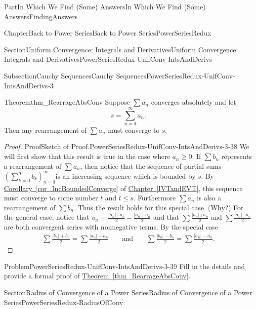 \documentclass[oneside,10pt,]{book}
\newcommand{\xreffont}{\relax}
\numberwithin{equation}{part}
\newcommand{\abs}[1]{\left|#1\right|}
\newcommand{\amp}{&}
\begin{document}
\begin{partptx}{Part}{In Which We Find (Some) Answers}{}{In Which We Find (Some) Answers}{}{}{FindingAnswers}
\begin{chapterptx}{Chapter}{Back to Power Series}{}{Back to Power Series}{}{}{PowerSeriesRedux}
\begin{sectionptx}{Section}{Uniform Convergence: Integrals and Derivatives}{}{Uniform Convergence: Integrals and Derivatives}{}{}{PowerSeriesRedux-UnifConv-IntsAndDerivs}
\begin{subsectionptx}{Subsection}{Cauchy Sequences}{}{Cauchy Sequences}{}{}{PowerSeriesRedux-UnifConv-IntsAndDerivs-3}
\begin{theorem}{Theorem}{}{}{thm_RearrageAbsConv}%
%
%
Suppose \(\sum a_n\) converges absolutely and let%
\begin{equation*}
s=\sum_{n=0}^\infty a_n\text{.}
\end{equation*}
Then any rearrangement of \(\sum a_n\) must converge to \(s\).%
\end{theorem}
\begin{proof}{Proof}{Sketch of Proof.}{PowerSeriesRedux-UnifConv-IntsAndDerivs-3-38}
We will first show that this result is true in the case where \(a_n\geq 0\).  If \(\sum b_n\) represents a rearrangement of \(\sum a_n\), then notice that the sequence of partial sums \(\displaystyle\left(\sum_{k=0}^nb_k\right)_{n=0}^\infty\)is an increasing sequence which is bounded by \(s\).  By \hyperref[cor_IncBoundedConverge]{Corollary~{\xreffont\ref{cor_IncBoundedConverge}}} of \hyperref[IVTandEVT]{Chapter~{\xreffont\ref{IVTandEVT}}}, this sequence must converge to some number \(t\) and \(t\leq s\).  Furthermore \(\sum a_n\) is also a rearrangement of \(\sum b_n\). Thus the result holds for this special case. (Why?) For the general case, notice that \(a_n=\frac{|a_n\mathopen|+a_n}{2}-\frac{|a_n\mathopen|-a_n}{2}\) and that \(\sum\frac{|a_n\mathopen|+a_n}{2}\) and \(\sum\frac{|a_n\mathopen|-a_n}{2}\) are both convergent series with nonnegative terms.  By the special case%
\begin{align*}
\sum\frac{\abs{b_n}+b_n}{2}=
\sum\frac{\abs{a_n}+a_n}{2}\amp{}\amp{}\text{ and }\amp{}\amp{}
\sum\frac{\abs{b_n}-b_n}{2}=
\sum\frac{\abs{a_n}-a_n}{2}.
\end{align*}
%
\end{proof}
\begin{problem}{Problem}{}{PowerSeriesRedux-UnifConv-IntsAndDerivs-3-39}%
Fill in the details and provide a formal proof of \hyperref[thm_RearrageAbsConv]{Theorem~{\xreffont\ref{thm_RearrageAbsConv}}}.%
\end{problem}
\end{subsectionptx}
\end{sectionptx}
%
%
\typeout{************************************************}
\typeout{************************************************}
%
\begin{sectionptx}{Section}{Radius of Convergence of a Power Series}{}{Radius of Convergence of a Power Series}{}{}{PowerSeriesRedux-RadiusOfConv}

\end{sectionptx}
\end{chapterptx}
\end{partptx}
\end{document}
